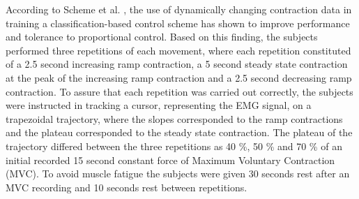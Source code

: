 According to Scheme et al. \cite{Scheme2015}, the use of dynamically changing contraction data in training a classification-based control scheme has shown to improve performance and tolerance to proportional control. Based on this finding, the subjects performed three repetitions of each movement, where each repetition constituted of a 2.5 second increasing ramp contraction, a 5 second steady state contraction at the peak of the increasing ramp contraction and a 2.5 second decreasing ramp contraction. To assure that each repetition was carried out correctly, the subjects were instructed in tracking a cursor, representing the EMG signal, on a trapezoidal trajectory, where the slopes corresponded to the ramp contractions and the plateau corresponded to the steady state contraction. The plateau of the trajectory differed between the three repetitions as 40 \%, 50 \% and 70 \% of an initial recorded 15 second constant force of Maximum Voluntary Contraction (MVC). To avoid muscle fatigue the subjects were given 30 seconds rest after an MVC recording and 10 seconds rest between repetitions. 